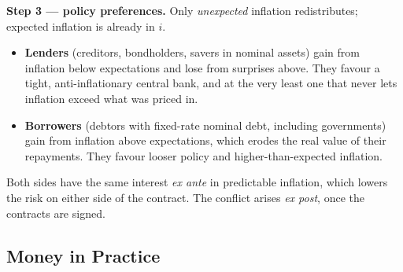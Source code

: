 \documentclass[12pt, letterpaper]{article}
\begin{document}
\begin{tcolorbox}[evenbox,title={Problem 11.8 \quad Real Interest Rates}]
\textbf{Step 3 --- policy preferences.} Only \emph{unexpected} inflation redistributes; expected
inflation is already in $i$.
\begin{itemize}
\item \textbf{Lenders} (creditors, bondholders, savers in nominal assets) gain from inflation
below expectations and lose from surprises above. They favour a tight, anti-inflationary
central bank, and at the very least one that never lets inflation exceed what was priced in.
\item \textbf{Borrowers} (debtors with fixed-rate nominal debt, including governments) gain from
inflation above expectations, which erodes the real value of their repayments. They favour
looser policy and higher-than-expected inflation.
\end{itemize}
Both sides have the same interest \emph{ex ante} in predictable inflation, which lowers the risk
on either side of the contract. The conflict arises \emph{ex post}, once the contracts are signed.
\end{tcolorbox}

\subsection{Money in Practice}
\end{document}
